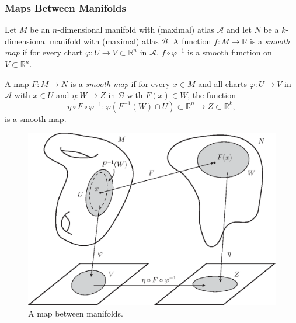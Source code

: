 \documentclass[12pt,a4paper]{article}
\begin{document}
\subsubsection{Maps Between Manifolds}
\begin{definition}
Let $M$ be an $n$-dimensional manifold with (maximal) atlas $\mathcal{A}$ and let $N$ be a $k$-dimensional manifold with (maximal) atlas $\mathcal{B}$. A function $f:M\to\mathbb{R}$ is a \textit{smooth map} if for every chart $\varphi:U\to V\subset\mathbb{R}^n$ in $\mathcal{A}$, $f\circ\varphi^{-1}$ is a smooth function on $V\subset\mathbb{R}^n$.

A map $F:M\to N$ is a \textit{smooth map} if for every $x\in M$ and all charts $\varphi:U\to V$ in $\mathcal{A}$ with $x\in U$ and $\eta:W\to Z$ in $\mathcal{B}$ with $F(x)\in W$, the function
\[
\eta\circ F\circ\varphi^{-1}:\varphi(F^{-1}(W)\cap U)\subset\mathbb{R}^n\to Z\subset\mathbb{R}^k,
\]
is a smooth map.
\end{definition}   

\begin{figure}[h!]
\centering
\includegraphics[scale=0.7]{fig/mani-map-1b}
\caption{A map between manifolds.}
\label{fig:mani-map-1}
\end{figure}
\end{document}
